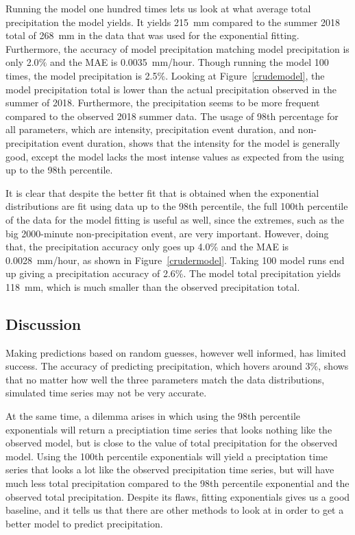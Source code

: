 \documentclass[11pt]{report}
\begin{document}
Running the model one hundred times lets us look at what average total
precipitation the model yields. It yields 215~mm compared to the summer 2018
total of 268~mm in the data that was used for the exponential
fitting. Furthermore, the accuracy of model precipitation matching model
precipitation is only 2.0$\%$ and the MAE is 0.0035~mm/hour. Though running the model 100 times, the model precipitation is 2.5\%. Looking at Figure~\ref{crudemodel}, the model precipitation total is lower than the actual precipitation observed in the summer of 2018. Furthermore, the precipitation seems to be more frequent compared to the observed 2018 summer data. The usage of 98th percentage for all parameters, which are intensity, precipitation event
duration, and non-precipitation event duration, shows that the intensity for
the model is generally good, except the model lacks the most intense values
as expected from the using up to the 98th percentile.

It is clear that despite the better fit that is obtained when the
exponential distributions are fit using data up to the 98th percentile,
the full 100th percentile of the data for the model fitting is useful as well,
since the extremes, such as the big 2000-minute non-precipitation event, are
very important. However, doing that, the precipitation accuracy only goes up 4.0\% and the MAE is 0.0028~mm/hour, as shown in Figure~\ref{crudermodel}. Taking 100 model runs end up giving a precipitation accuracy of 2.6\%. The model total precipitation yields 118~mm, which is much smaller than the observed precipitation total. 


\subsection{Discussion}\label{sec:spc_d}

Making predictions based on random guesses, however well informed, has
limited success. The accuracy of predicting precipitation, which hovers
around 3\%, shows that no matter how well the three parameters match the
data distributions, simulated time series may not be very accurate.

At the same time, a dilemma arises in which using the 98th percentile
exponentials will return a preciptiation time series that looks nothing like
the observed model, but is close to the value of total precipitation for the
observed model. Using the 100th percentile exponentials will yield a
preciptation time series that looks a lot like the observed precipitation
time series, but will have much less total precipitation compared to the
98th percentile exponential and the observed total precipitation. Despite its flaws, fitting exponentials gives us a good baseline, and it
tells us that there are other methods to look at in order to get a better
model to predict precipitation.
\end{document}
